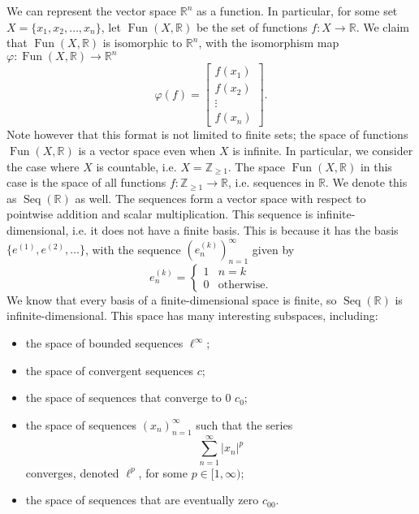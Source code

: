 \documentclass[a4paper, openany]{memoir}
\theoremstyle{definition}
\theoremstyle{plain}
\begin{document}
    We can represent the vector space $\mathbb{R}^n$ as a function. In particular, for some set $X = \{x_1, x_2, \dots, x_n\}$, let $\operatorname{Fun}(X, \mathbb{R})$ be the set of functions $f \colon X \to \mathbb{R}$. We claim that $\operatorname{Fun}(X, \mathbb{R})$ is isomorphic to $\mathbb{R}^n$, with the isomorphism map $\varphi \colon \operatorname{Fun}(X, \mathbb{R}) \to \mathbb{R}^n$
    \[\varphi(f) = \begin{bmatrix}
        f(x_1) \\
        f(x_2) \\
        \vdots \\
        f(x_n)
    \end{bmatrix}.\]
    Note however that this format is not limited to finite sets; the space of functions $\operatorname{Fun}(X, \mathbb{R})$ is a vector space even when $X$ is infinite. In particular, we consider the case where $X$ is countable, i.e. $X = \mathbb{Z}_{\geq 1}$. The space $\operatorname{Fun}(X, \mathbb{R})$ in this case is the space of all functions $f \colon \mathbb{Z}_{\geq 1} \to \mathbb{R}$, i.e. sequences in $\mathbb{R}$. We denote this as $\operatorname{Seq}(\mathbb{R})$ as well. The sequences form a vector space with respect to pointwise addition and scalar multiplication. This sequence is infinite-dimensional, i.e. it does not have a finite basis. This is because it has the basis $\{e^{(1)}, e^{(2)}, \dots\}$, with the sequence $(e_n^{(k)})_{n=1}^\infty$ given by
    \[e_n^{(k)} = \begin{cases}
        1 & n = k \\
        0 & \textrm{otherwise}.
    \end{cases}\]
    We know that every basis of a finite-dimensional space is finite, so $\operatorname{Seq}(\mathbb{R})$ is infinite-dimensional. This space has many interesting subspaces, including:
    \begin{itemize}
        \item the space of bounded sequences $\ell^\infty$;
        \item the space of convergent sequences $c$;
        \item the space of sequences that converge to 0 $c_0$;
        \item the space of sequences $(x_n)_{n=1}^\infty$ such that the series
        \[\sum_{n=1}^\infty |x_n|^p\]
        converges, denoted $\ell^p$, for some $p \in [1, \infty)$;
        \item the space of sequences that are eventually zero $c_{00}$.
    \end{itemize}
    
\end{document}
